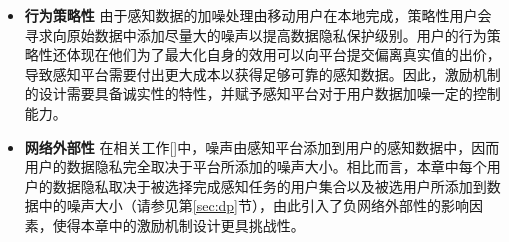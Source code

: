 	\begin{itemize}
	    	\item {\bfseries 行为策略性} 由于感知数据的加噪处理由移动用户在本地完成，策略性用户会寻求向原始数据中添加尽量大的噪声以提高数据隐私保护级别。用户的行为策略性还体现在他们为了最大化自身的效用可以向平台提交偏离真实值的出价，导致感知平台需要付出更大成本以获得足够可靠的感知数据。因此，激励机制的设计需要具备诚实性的特性，并赋予感知平台对于用户数据加噪一定的控制能力。
		
		\item {\bfseries 网络外部性} 
		在相关工作[]中，噪声由感知平台添加到用户的感知数据中，因而用户的数据隐私完全取决于平台所添加的噪声大小。相比而言，本章中每个用户的数据隐私取决于被选择完成感知任务的用户集合以及被选用户所添加到数据中的噪声大小（请参见第\ref{sec:dp}节），由此引入了{\kaishu 负网络外部性}的影响因素，使得本章中的激励机制设计更具挑战性。
	    

\end{itemize}
